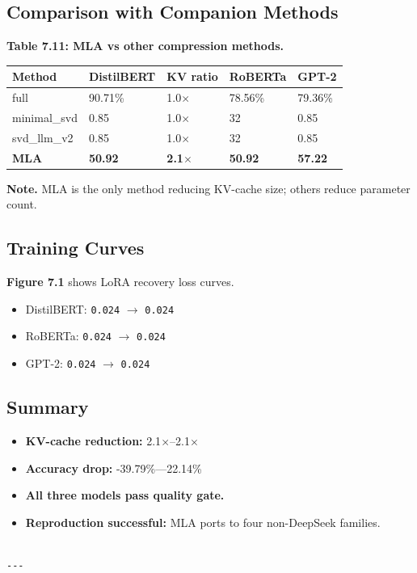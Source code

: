 \subsection{Comparison with Companion Methods}

\textbf{Table 7.11: MLA vs other compression methods.}

\begin{table}[H]
\centering
\small
\begin{tabular}{lllll}
\toprule
\textbf{Method} & \textbf{DistilBERT} & \textbf{KV ratio} & \textbf{RoBERTa} & \textbf{GPT-2} \\
\midrule
full & 90.71\% & 1.0$\times$ & 78.56\% & 79.36\% \\
minimal\_svd & 0.85 & 1.0$\times$ & 32 & 0.85 \\
svd\_llm\_v2 & 0.85 & 1.0$\times$ & 32 & 0.85 \\
\textbf{MLA} & \textbf{50.92} & \textbf{2.1$\times$} & \textbf{50.92} & \textbf{57.22} \\
\bottomrule
\end{tabular}
\end{table}

\textbf{Note.} MLA is the only method reducing KV-cache size; others reduce 
parameter count.

\subsection{Training Curves}

\textbf{Figure 7.1} shows LoRA recovery loss curves.

\begin{itemize}
\item DistilBERT: \texttt{0.024} $\to$ \texttt{0.024}
\item RoBERTa: \texttt{0.024} $\to$ \texttt{0.024}
\item GPT-2: \texttt{0.024} $\to$ \texttt{0.024}

\end{itemize}
\subsection{Summary}

\begin{itemize}
\item \textbf{KV-cache reduction:} 2.1$\times$--2.1$\times$
\item \textbf{Accuracy drop:} -39.79\%---22.14\%
\item \textbf{All three models pass quality gate.}
\item \textbf{Reproduction successful:} MLA ports to four non-DeepSeek families.
\end{itemize}
\begin{lstlisting}

---
\end{lstlisting}

